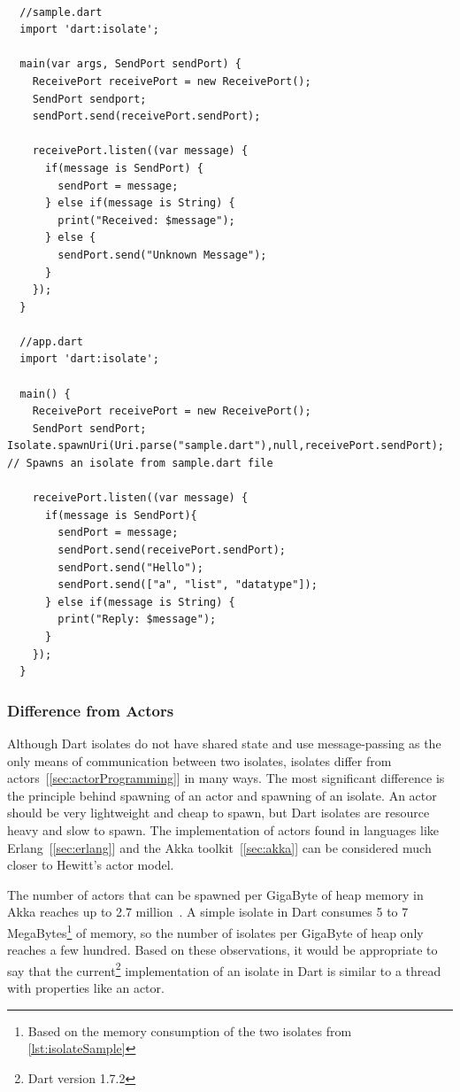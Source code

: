 \begin{lstlisting}[caption=A simple example of isolate communication in dart, label=lst:isolateSample]

  //sample.dart
  import 'dart:isolate';

  main(var args, SendPort sendPort) {
    ReceivePort receivePort = new ReceivePort();
    SendPort sendport;
    sendPort.send(receivePort.sendPort);

    receivePort.listen((var message) {
      if(message is SendPort) {
        sendPort = message;
      } else if(message is String) {
        print("Received: $message");
      } else {
        sendPort.send("Unknown Message");
      }
    });
  }

  //app.dart
  import 'dart:isolate';

  main() {
    ReceivePort receivePort = new ReceivePort();
    SendPort sendPort;  Isolate.spawnUri(Uri.parse("sample.dart"),null,receivePort.sendPort); // Spawns an isolate from sample.dart file

    receivePort.listen((var message) {
      if(message is SendPort){
        sendPort = message;
        sendPort.send(receivePort.sendPort);
        sendPort.send("Hello");
        sendPort.send(["a", "list", "datatype"]);
      } else if(message is String) {
        print("Reply: $message");
      }
    });
  }
\end{lstlisting}

  \subsubsection{Difference from Actors}
  Although Dart isolates do not have shared state and use message-passing as the only means of communication between two isolates, isolates differ from actors~[\autoref{sec:actorProgramming}] in many ways. The most significant difference is the principle behind spawning of an actor and spawning of an isolate. An actor should be very lightweight and cheap to spawn, but Dart isolates are resource heavy and slow to spawn. The implementation of actors found in languages like Erlang~[\autoref{sec:erlang}] and the Akka toolkit~[\autoref{sec:akka}] can be considered much closer to Hewitt's actor model.

  The number of actors that can be spawned per GigaByte of heap memory in Akka reaches up to 2.7 million~\cite{akkaHome}. A simple isolate in Dart consumes 5 to 7 MegaBytes\footnote{Based on the memory consumption of the two isolates from \autoref{lst:isolateSample}} of memory, so the number of isolates per GigaByte of heap only reaches a few hundred. Based on these observations, it would be appropriate to say that the current\footnote{Dart version 1.7.2} implementation of an isolate in Dart is \textemdash{} similar to a thread with properties like an actor.

